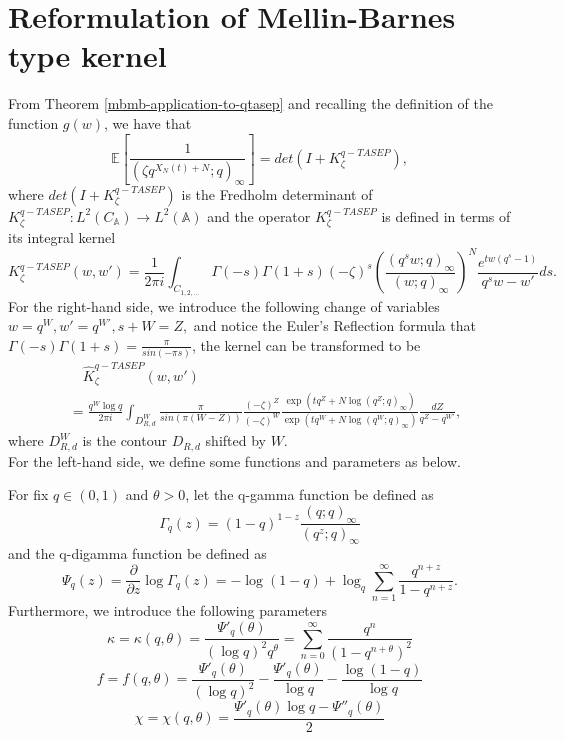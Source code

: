 \section{Reformulation of Mellin-Barnes type kernel}
\label{sec:reformulation-kernel}
From Theorem \ref{mbmb-application-to-qtasep} and recalling the definition of the function $g(w)$, we have that 
\begin{equation}
\label{continuation-equation}
\mathbb{E} \left[ \frac{1}{(\zeta q^{X_N(t)+N}; q)_{\infty}} \right] = det(I+K_{\zeta}^{q-TASEP}),
\end{equation}
where $det(I+K_{\zeta}^{q-TASEP})$ is the Fredholm determinant of $K_{\zeta}^{q-TASEP}: L^2(C_{\mathbb{A}}) \rightarrow L^2(\mathbb{A})$ and the operator $K_{\zeta}^{q-TASEP}$ is defined in terms of its integral kernel
$$K_{\zeta}^{q-TASEP}(w,w') = \frac{1}{2 \pi i} \int_{C_{1,2,\dots}} \Gamma(-s) \Gamma(1+s) (-\zeta)^s \left(\frac{(q^s w; q)_{\infty}}{(w;q)_{\infty}}\right)^N \frac{e^{tw(q^s-1)}}{q^sw - w'} ds.$$
For the right-hand side, we introduce the following change of variables $w = q^W, w' = q^{W'}, s+W = Z,$ and notice the Euler's Reflection formula that $\Gamma(-s) \Gamma(1+s) = \frac{\pi}{sin(-\pi s)}$, the kernel can be transformed to be 
\begin{align*}
& \quad \hat{K}_{\zeta}^{q-TASEP}(w,w') \\
& = \frac{q^W \log q}{2 \pi i} \int_{D^W_{R,d}} \frac{\pi}{sin(\pi (W-Z))} \frac{(-\zeta)^Z}{(-\zeta)^W} \frac{\exp(tq^Z+N\log(q^Z;q)_{\infty})}{\exp(tq^W+N\log(q^W;q)_{\infty})} \frac{dZ}{q^Z - q^{W'}},
\end{align*}
where $D^W_{R,d}$ is the contour $D_{R,d}$ shifted by $W$.\\

For the left-hand side, we define some functions and parameters as below.
\begin{definition}
For fix $q \in (0,1)$ and $\theta > 0$, let the q-gamma function be defined as $$\Gamma_q(z) = (1-q)^{1-z} \frac{(q;q)_{\infty}}{(q^z;q)_{\infty}}$$ and the q-digamma function be defined as $$\Psi_q(z) = \frac{\partial}{\partial z} \log \Gamma_q(z) = -\log(1-q) + \log_q \sum_{n=1}^{\infty} \frac{q^{n+z}}{1 - q^{n+z}}.$$
Furthermore, we introduce the following parameters
\begin{equation*}
\kappa = \kappa(q,\theta) = \frac{\Psi'_q(\theta)}{(\log q)^2 q^{\theta}} = \sum_{n=0}^{\infty} \frac{q^n}{(1-q^{n+\theta})^2}
\end{equation*}
\begin{equation*}
f = f(q,\theta) = \frac{\Psi'_q(\theta)}{(\log q)^2} - \frac{\Psi'_q(\theta)}{\log q} - \frac{\log(1-q)}{\log q}
\end{equation*}
\begin{equation*}
\chi = \chi(q,\theta) = \frac{\Psi'_q(\theta) \log q - \Psi''_q(\theta)}{2}
\end{equation*}
\end{definition}

